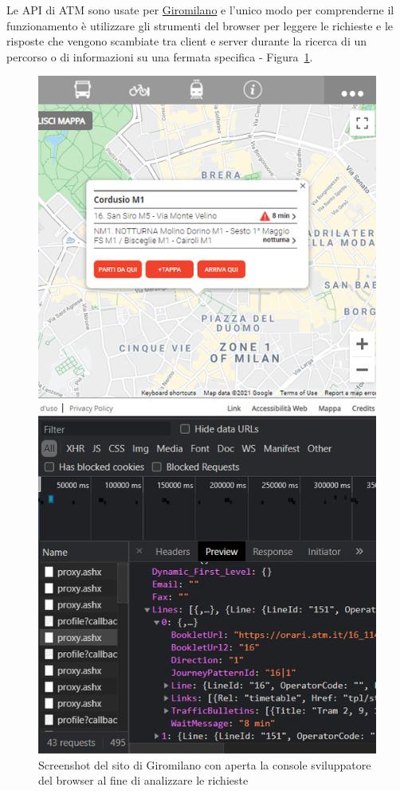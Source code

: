 \documentclass[12pt,a4paper]{report}
\begin{document}
Le API di ATM sono usate per \href{https://giromilano.atm.it}{Giromilano} e l'unico modo per comprenderne il funzionamento è utilizzare
gli strumenti del browser per leggere le richieste e le risposte che vengono scambiate tra client e server durante la ricerca di un
percorso o di informazioni su una fermata specifica - Figura~\ref{fig:giromilanoconsolel}.

\begin{figure}[h]
  \centering
  \includegraphics[width=\textwidth,height=0.95\textheight,keepaspectratio]{giromilanoconsole}
  \caption{Screenshot del sito di Giromilano con aperta la console sviluppatore del browser al fine di analizzare le richieste}
  \label{fig:giromilanoconsolel}
\end{figure}
\end{document}

